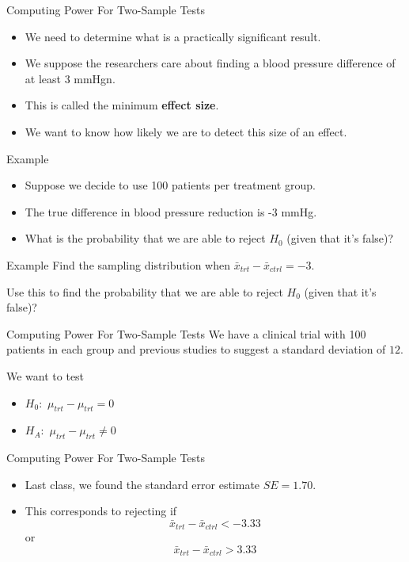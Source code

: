 \begin{frame}{Computing Power For Two-Sample Tests}
    \begin{itemize}
        \item We need to determine what is a practically significant result. 
        \item We suppose the researchers care about finding a blood pressure difference of at least 3 mmHgn.
        \item This is called the minimum \textbf{effect size}. 
        \item We want to know how likely we are to detect this size of an effect.
    \end{itemize}
\end{frame}

\begin{frame}{Example}
    \begin{itemize}
        \item Suppose we decide to use 100 patients per treatment group.
        \item The true difference in blood pressure reduction is -3 mmHg.
        \item What is the probability that we are able to reject $H_0$ (given that it's false)?
    \end{itemize}
\end{frame}

\begin{frame}{Example}
    Find the sampling distribution when $\bar{x}_{trt} − \bar{x}_{ctrl} = -3$.
    
    \vspace{24pt}Use this to find the probability that we are able to reject $H_0$ (given that it's false)?
\end{frame}

\begin{frame}{Computing Power For Two-Sample Tests}
    We have a clinical trial with 100 patients in each group and previous studies to suggest a standard deviation of $12$.
    
    \vspace{12pt}
    We want to test
    \begin{itemize}
        \item $H_0:$ $\mu_{trt} - \mu_{trt} = 0$
        \item $H_A:$ $\mu_{trt} - \mu_{trt} \ne 0$
    \end{itemize}
\end{frame}

\begin{frame}{Computing Power For Two-Sample Tests}
    \begin{itemize}
        \item Last class, we found the standard error estimate $SE=1.70$.
        \item This corresponds to rejecting if 
        \[\bar{x}_{trt} − \bar{x}_{ctrl} < -3.33\] 
        or \[\bar{x}_{trt} − \bar{x}_{ctrl} > 3.33\]
    \end{itemize}
\end{frame}

